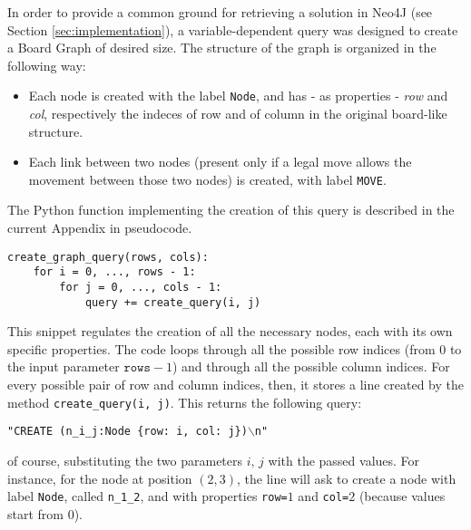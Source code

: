 \documentclass[conference]{IEEEtran}
\begin{document}
In order to provide a common ground for retrieving a solution in Neo4J \cite{neo4j} (see Section \ref{sec:implementation}), a variable-dependent query was designed to create a Board Graph of desired size. The structure of the graph is organized in the following way:
\begin{itemize}
	\item Each node is created with the label \texttt{Node}, and has - as properties - \textit{row} and \textit{col}, respectively the indeces of row and of column in the original board-like structure.
	\item Each link between two nodes (present only if a legal move allows the movement between those two nodes) is created, with label \texttt{MOVE}.
\end{itemize}
The Python function implementing the creation of this query is described in the current Appendix in pseudocode.

\begin{tcolorbox}[colback=yellow!5!white, colframe=yellow!50!black]
\begin{verbatim}
create_graph_query(rows, cols):
	for i = 0, ..., rows - 1:
		for j = 0, ..., cols - 1:
			query += create_query(i, j)
\end{verbatim}
\end{tcolorbox}

This snippet regulates the creation of all the necessary nodes, each with its own specific properties. The code loops through all the possible row indices (from $0$ to the input parameter $\texttt{rows} - 1$) and through all the possible column indices. For every possible pair of row and column indices, then, it stores a line created by the method \texttt{create\_query(i, j)}. This returns the following query:
\begin{center}
	\texttt{"CREATE (n\_i\_j:Node \{row: i, col: j\})$\backslash$n"}
\end{center}
of course, substituting the two parameters $i,\,j$ with the passed values. For instance, for the node at position $(2, 3)$, the line will ask to create a node with label \texttt{Node}, called \texttt{n\_1\_2}, and with properties \texttt{row=}$1$ and \texttt{col=}$2$ (because values start from $0$).
\end{document}
